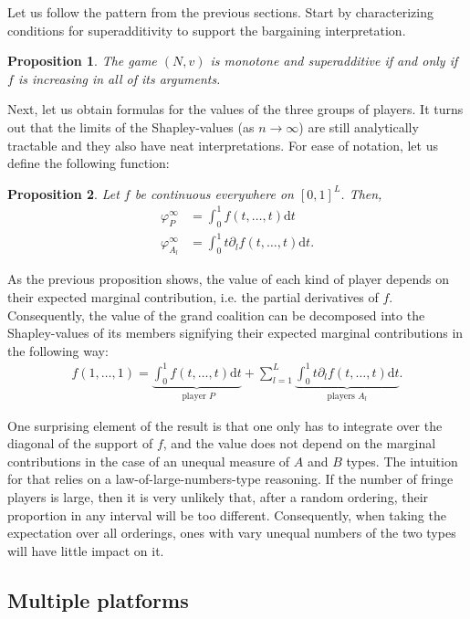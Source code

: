 \documentclass[a4paper]{article}
\newtheorem{proposition}{Proposition}
\newcommand{\dt}{\mathrm{d}t}
\begin{document}
Let us follow the pattern from the previous sections.
Start by characterizing conditions for superadditivity to support the bargaining interpretation.
\begin{proposition}
    The game $(N, v)$ is monotone and superadditive if and only if $f$ is increasing in all of its arguments.
\end{proposition}

Next, let us obtain formulas for the values of the three groups of players.
It turns out that the limits of the Shapley-values (as $n \to \infty$) are still analytically tractable and they also have neat interpretations.
For ease of notation, let us define the following function:

\begin{proposition}
    Let $f$ be continuous everywhere on $[0, 1]^L$.
    Then,
    \begin{align*}
        \varphi_P^\infty & = \int_0^1 f(t, \dots, t) \dt                                 \\
        \varphi_{A_l}^\infty & = \int_0^1 t \partial_l f(t, \dots, t) \dt.
    \end{align*}
\end{proposition}

As the previous proposition shows, the value of each kind of player depends on their expected marginal contribution, i.e. the partial derivatives of $f$.
Consequently, the value of the grand coalition can be decomposed into the Shapley-values of its members signifying their expected marginal contributions in the following way:
\begin{align*}
    f(1, \dots, 1) = \underbrace{\int_0^1 f(t, \dots, t) \dt}_{\text{ player } P} + \sum_{l=1}^L \underbrace{\int_0^1 t \partial_l f(t, \dots, t) \dt}_{\text{players } A_l}.
\end{align*}

One surprising element of the result is that one only has to integrate over the diagonal of the support  of $f$, and the value does not depend on the marginal contributions in the case of an unequal measure of $A$ and $B$ types.
The intuition for that relies on a law-of-large-numbers-type reasoning.
If the number of fringe players is large, then it is very unlikely that, after a random ordering, their proportion in any interval will be too different.
Consequently, when taking the expectation over all orderings, ones with vary unequal numbers of the two types will have little impact on it.


\subsection{Multiple platforms}
\end{document}
